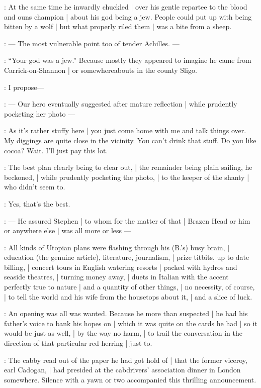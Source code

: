 :
At the same time he inwardly chuckled |
over his gentle repartee to the blood and ouns champion |
about his god being a jew.
People could put up with being bitten by a wolf |
but what properly riled them |
was a bite from a sheep.

:
    --- The most vulnerable point too of tender Achilles. ---

:
``Your god was a jew.''
Because mostly they appeared to imagine he came from Carrick-on-Shannon |
or somewhereabouts in the county Sligo.

\Bloom:
I propose---

:
    --- Our hero eventually suggested after mature reflection |
    while prudently pocketing her photo ---

\Bloom:
As it's rather stuffy here |
you just come home with me and talk things over.
My diggings are quite close in the vicinity.
You can't drink that stuff.
Do you like cocoa?
Wait.
I'll just pay this lot.

:
The best plan clearly being to clear out, |
the remainder being plain sailing, he beckoned, |
while prudently pocketing the photo, |
to the keeper of the shanty |
who didn't seem to.

\Bloom:
Yes, that's the best.

:
    --- He assured Stephen |
        to whom for the matter of that |
        Brazen Head or him or anywhere else |
        was all more or less ---

:
All kinds of Utopian plans were flashing through his (B.'s) busy brain, |
education (the genuine article), literature, journalism, |
prize titbits, up to date billing, |
concert tours in English watering resorts |
packed with hydros and seaside theatres, |
turning money away, |
duets in Italian with the accent perfectly true to nature |
and a quantity of other things, |
no necessity, of course, |
to tell the world and his wife from the housetops about it, |
and a slice of luck.

:
An opening was all was wanted.
Because he more than suspected |
he had his father's voice to bank his hopes on |
which it was quite on the cards he had |
so it would be just as well, |
by the way no harm, |
to trail the conversation in the direction of that particular red herring |
just to.

:
The cabby read out of the paper he had got hold of |
that the former viceroy, earl Cadogan, |
had presided at the cabdrivers' association dinner in London somewhere.
Silence with a yawn or two accompanied this thrilling announcement.

